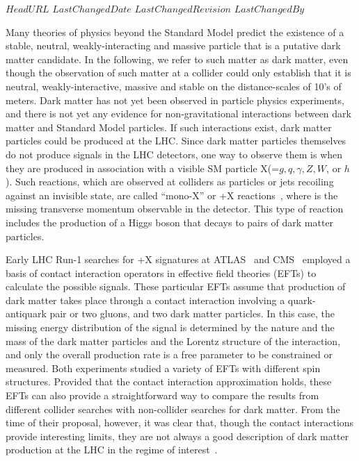 \svnidlong
{$HeadURL$}
{$LastChangedDate$}
{$LastChangedRevision$}
{$LastChangedBy$}

Many theories of physics beyond the Standard Model predict the existence
of a stable, neutral, weakly-interacting and massive particle that is
a putative dark matter candidate.   In the following, we refer to such
matter as dark matter, even though the observation of such matter at a collider
could only establish that it is neutral, weakly-interactive, massive and stable
on the distance-scales of 10's of meters.
Dark matter has not yet been observed in particle physics experiments, and
there is not yet any evidence for non-gravitational interactions
between dark matter and Standard Model particles.  If such
interactions exist, dark matter particles could be produced
at the LHC. Since dark matter particles themselves do not produce signals
in the LHC detectors, one way to observe them is when they are produced in association
with a visible SM particle X(=$g, q, \gamma, Z, W$, or $h$).
Such reactions, which are
observed at colliders as particles or jets recoiling against an invisible state, are
called ``mono-X'' or \MET{}+X reactions~\cite{Feng:2005gj,Beltran:2010ww,Bai:2010hh}, 
where \MET is the missing transverse momentum observable in the detector.
This type of reaction includes the production of a Higgs boson that
decays to pairs of dark matter particles.

Early LHC Run-1 searches for \MET{}+X signatures at ATLAS~\cite{Aad:2015zva,Aad:2014tda,ATLAS:2014wra,Aad:2014vka,Aad:2013oja,Aad:2014wza,Aad:2014vea,ATL-PHYS-PUB-2014-007} and CMS~\cite{Khachatryan:2014rra,Khachatryan:2014rwa,Khachatryan:2014tva,Khachatryan:2014uma,Khachatryan:2015nua,CMS-PAS-B2G-13-004,CMS-PAS-EXO-14-004} employed
a basis of contact interaction operators in 
effective field theories (EFTs) \cite{Goodman:2010yf,Goodman:2010ku} to
calculate the possible signals.
These particular EFTs assume that production of dark matter takes place through
a contact interaction involving a quark-antiquark pair or two gluons, and
two dark matter particles.  In this case,
the missing
energy distribution of the signal is determined
by the nature and the mass of the dark
matter particles and the Lorentz structure of the interaction, and only the
overall production rate is a free parameter to be constrained or measured.
Both experiments studied a variety
of EFTs with different spin structures. Provided that the contact
interaction approximation holds, these EFTs can also provide a
straightforward way to compare the results from different collider
searches with non-collider searches for dark matter.  
From the time of their proposal, however, it was clear that,
 though the contact interactions provide interesting limits, 
 they are not always a good description of dark matter production 
 at the LHC in the regime of interest~\cite{Goodman:2010yf,Shoemaker:2011vi}. 

